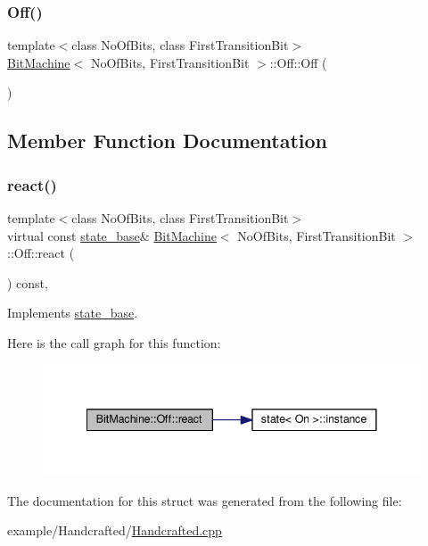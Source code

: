 \subsubsection{\texorpdfstring{Off()}{Off()}}
{\footnotesize\ttfamily template$<$class No\+Of\+Bits, class First\+Transition\+Bit$>$ \\
\mbox{\hyperlink{struct_bit_machine}{Bit\+Machine}}$<$ No\+Of\+Bits, First\+Transition\+Bit $>$\+::Off\+::\+Off (\begin{DoxyParamCaption}{ }\end{DoxyParamCaption})\hspace{0.3cm}{\ttfamily [inline]}}



\subsection{Member Function Documentation}
\mbox{\label{struct_bit_machine_1_1_off_ae42704b63f585da48706638ad75ca3fb}} 
\subsubsection{\texorpdfstring{react()}{react()}}
{\footnotesize\ttfamily template$<$class No\+Of\+Bits, class First\+Transition\+Bit$>$ \\
virtual const \mbox{\hyperlink{classstate__base}{state\+\_\+base}}\& \mbox{\hyperlink{struct_bit_machine}{Bit\+Machine}}$<$ No\+Of\+Bits, First\+Transition\+Bit $>$\+::Off\+::react (\begin{DoxyParamCaption}\item[{const \mbox{\hyperlink{struct_ev_flip_bit}{Ev\+Flip\+Bit}} \&}]{ }\end{DoxyParamCaption}) const\hspace{0.3cm}{\ttfamily [inline]}, {\ttfamily [virtual]}}



Implements \mbox{\hyperlink{classstate__base_a2ee5b06850f92dd17ff82907bed15308}{state\+\_\+base}}.

Here is the call graph for this function\+:
\nopagebreak
\begin{figure}[H]
\begin{center}
\leavevmode
\includegraphics[width=341pt]{struct_bit_machine_1_1_off_ae42704b63f585da48706638ad75ca3fb_cgraph}
\end{center}
\end{figure}


The documentation for this struct was generated from the following file\+:\begin{DoxyCompactItemize}
\item 
example/\+Handcrafted/\mbox{\hyperlink{_handcrafted_8cpp}{Handcrafted.\+cpp}}\end{DoxyCompactItemize}
